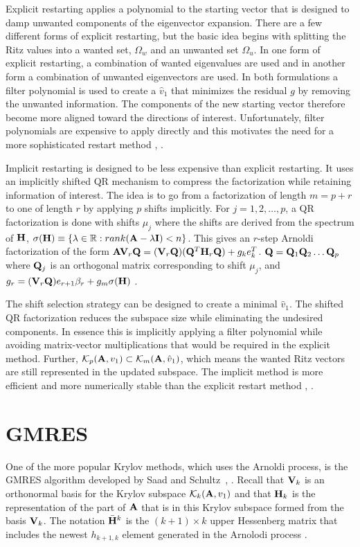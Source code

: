 Explicit restarting applies a polynomial to the starting vector that is designed to damp unwanted components of the eigenvector expansion. There are a few different forms of explicit restarting, but the basic idea begins with splitting the Ritz values into a wanted set, $\Omega_w$ and an unwanted set $\Omega_u$. In one form of explicit restarting, a combination of wanted eigenvalues are used and in another form a combination of unwanted eigenvectors are used. In both formulations a filter polynomial is used to create a $\hat{v}_1$ that minimizes the residual $g$ by removing the unwanted information. The components of the new starting vector therefore become more aligned toward the directions of interest. Unfortunately, filter polynomials are expensive to apply directly and this motivates the need for a more sophisticated restart method \cite{Sorensen1996}, \cite{Stewart2001}.

Implicit restarting is designed to be less expensive than explicit restarting. It uses an implicitly shifted QR mechanism to compress the factorization while retaining information of interest. The idea is to go from a factorization of length $m = p + r$ to one of length $r$ by applying $p$ shifts implicitly. For $j = 1,2,\dots,p$, a QR factorization is done with shifts $\mu_j$ where the shifts are derived from the spectrum of $\mathbf{H}$, $\sigma(\mathbf{H}) \equiv \{\lambda \in \mathbb{R}: rank(\mathbf{A} - \lambda \mathbf{I}) < n\}$. This gives an $r$-step Arnoldi factorization of the form $\mathbf{AV}_r \mathbf{Q} = (\mathbf{V}_r \mathbf{Q})(\mathbf{Q}^T \mathbf{H}_r \mathbf{Q}) + g_k e^T_k$. $\mathbf{Q} = \mathbf{Q}_1 \mathbf{Q}_2 \dots \mathbf{Q}_p$ where $\mathbf{Q}_j$ is an orthogonal matrix corresponding to shift $\mu_j$, and $g_r = (\mathbf{V}_r \mathbf{Q}) e_{r+1} \beta_r + g_m \sigma(\mathbf{H})$ \cite{Sorensen1996}.

The shift selection strategy can be designed to create a minimal $\hat{v}_1$. The shifted QR factorization reduces the subspace size while eliminating the undesired components. In essence this is implicitly applying a filter polynomial while avoiding matrix-vector multiplications that would be required in the explicit method. Further, $\mathcal{K}_p(\mathbf{A},v_1) \subset \mathcal{K}_m(\mathbf{A}, \hat{v}_1)$, which means the wanted Ritz vectors are still represented in the updated subspace. The implicit method is more efficient and more numerically stable than the explicit restart method \cite{Sorensen1996}, \cite{Stewart2001}.

\section{GMRES}
One of the more popular Krylov methods, which uses the Arnoldi process, is the GMRES algorithm developed by Saad and Schultz~\cite{Saad1986}, \cite{Knoll2004}. Recall that $\mathbf{V}_{k}$ is an orthonormal basis for the Krylov subspace $\mathcal{K}_{k}(\mathbf{A}, v_1)$ and that $\mathbf{H}_{k}$ is the representation of the part of $\mathbf{A}$ that is in this Krylov subspace formed from the basis $\mathbf{V}_{k}$. The notation $\bar{\mathbf{H}}^{k}$ is the $(k+1) \times k$ upper Hessenberg matrix that includes the newest $h_{k+1,k}$ element generated in the Arnolodi process \cite{Saad1986}. 

